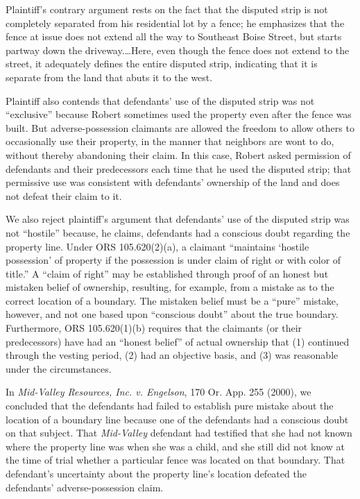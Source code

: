 Plaintiff's contrary argument rests on the fact that the disputed strip is not
completely separated from his residential lot by a fence; he emphasizes that
the fence at issue does not extend all the way to Southeast Boise Street, but
starts partway down the driveway.\ldots Here, even though the fence does not
extend to the street, it adequately defines the entire disputed strip,
indicating that it is separate from the land that abuts it to the west.

Plaintiff also contends that defendants' use of the disputed strip was not
``exclusive'' because Robert sometimes used the property even after the fence
was built. But adverse-possession claimants are allowed the freedom to allow
others to occasionally use their property, in the manner that neighbors are
wont to do, without thereby abandoning their claim. In this case, Robert asked
permission of defendants and their predecessors each time that he used the
disputed strip; that permissive use was consistent with defendants' ownership
of the land and does not defeat their claim to it.

We also reject plaintiff's argument that defendants' use of the disputed strip
was not ``hostile'' because, he claims, defendants had a conscious doubt
regarding the property line. Under ORS 105.620(2)(a), a claimant ``maintains
`hostile possession' of property if the possession is under claim of right or
with color of title.'' A ``claim of right'' may be established through proof of
an honest but mistaken belief of ownership, resulting, for example, from a
mistake as to the correct location of a boundary. The mistaken belief must be a
``pure'' mistake, however, and not one based upon ``conscious doubt'' about the
true boundary. Furthermore, ORS 105.620(1)(b) requires that the claimants (or
their predecessors) have had an ``honest belief'' of actual ownership that (1)
continued through the vesting period, (2) had an objective basis, and (3) was
reasonable under the circumstances.

In \textit{Mid-Valley Resources, Inc. v. Engelson}, 170 Or. App. 255 (2000), we
concluded that the defendants had failed to establish pure mistake about the
location of a boundary line because one of the defendants had a conscious doubt
on that subject. That \textit{Mid-Valley} defendant had testified that she had
not known where the property line was when she was a child, and she still did
not know at the time of trial whether a particular fence was located on that
boundary. That defendant's uncertainty about the property line's location
defeated the defendants' adverse-possession claim.

